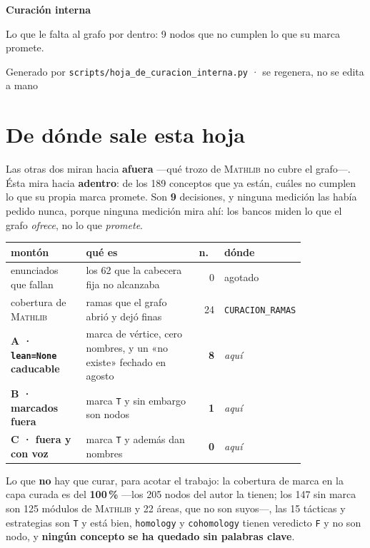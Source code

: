 \documentclass[10pt,a4paper]{article}
\newcommand{\Mathlib}{\textsc{Mathlib}}
\begin{document}
\begin{center}
{\LARGE\bfseries\color{acento} Curación interna}\par\smallskip
{\color{suave}\small Lo que le falta al grafo por dentro: 9 nodos que no cumplen lo que su marca promete.}\par
{\color{suave}\footnotesize Generado por \texttt{scripts/hoja\_de\_curacion\_interna.py} · se regenera, no se edita a mano}
\end{center}
\vspace{4pt}
\section*{De dónde sale esta hoja}

Las otras dos miran hacia \textbf{afuera} —qué trozo de \Mathlib{} no cubre el
grafo—. Ésta mira hacia \textbf{adentro}: de los 189
conceptos que ya están, cuáles no cumplen lo que su propia marca promete.
Son \textbf{9} decisiones, y ninguna medición las había
pedido nunca, porque ninguna medición mira ahí: los bancos miden lo que el
grafo \emph{ofrece}, no lo que \emph{promete}.\par\medskip

\noindent\small\begin{tabular}{@{}>{\raggedright\arraybackslash}p{0.26\linewidth}>{\raggedright\arraybackslash}p{0.40\linewidth}r>{\raggedright\arraybackslash}p{0.16\linewidth}@{}}\toprule
montón & qué es & n.\ & dónde\\\midrule
enunciados que fallan & los 62 que la cabecera fija no alcanzaba & 0 & agotado\\
cobertura de \Mathlib{} & ramas que el grafo abrió y dejó finas & 24 & \texttt{CURACION\_RAMAS}\\
\textbf{A · \texttt{lean=None} caducable} & marca de vértice, cero nombres, y un «no existe» fechado en agosto & \textbf{8} & \emph{aquí}\\
\textbf{B · marcados fuera} & marca \texttt{T} y sin embargo son nodos & \textbf{1} & \emph{aquí}\\
\textbf{C · fuera y con voz} & marca \texttt{T} y además dan nombres & \textbf{0} & \emph{aquí}\\
\bottomrule\end{tabular}\par\medskip

\noindent Lo que \textbf{no} hay que curar, para acotar el trabajo: la
cobertura de marca en la capa curada es del \textbf{100\,\%} —los 205 nodos
del autor la tienen; los 147 sin marca son 125 módulos de \Mathlib{} y 22
áreas, que no son suyos—, las 15 tácticas y estrategias son \texttt{T} y está
bien, \texttt{homology} y \texttt{cohomology} tienen veredicto \texttt{F} y no
son nodo, y \textbf{ningún concepto se ha quedado sin palabras clave}.
\par\medskip
\end{document}
